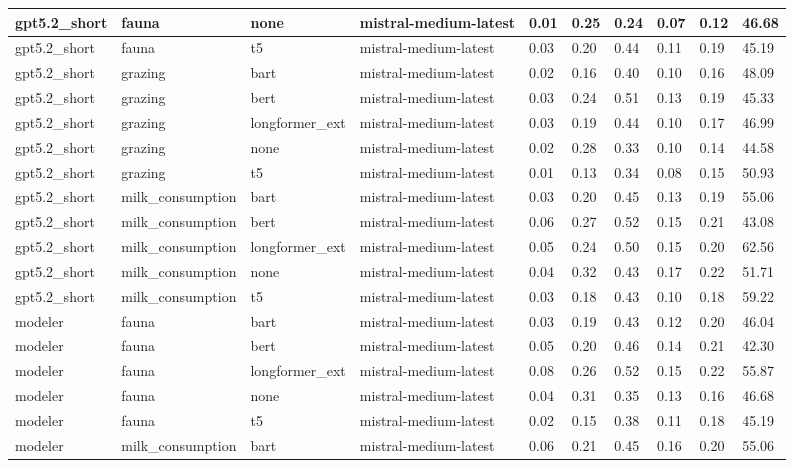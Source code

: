 \begin{tabular}{|l|l|l|l|l|l|l|l|l|l|}
 \hline
 gpt5.2\_short & fauna & none & mistral-medium-latest & 0.01 & 0.25 & 0.24 & 0.07 & 0.12 & 46.68 \\
 \hline
 gpt5.2\_short & fauna & t5 & mistral-medium-latest & 0.03 & 0.20 & 0.44 & 0.11 & 0.19 & 45.19 \\
 \hline
 gpt5.2\_short & grazing & bart & mistral-medium-latest & 0.02 & 0.16 & 0.40 & 0.10 & 0.16 & 48.09 \\
 \hline
 gpt5.2\_short & grazing & bert & mistral-medium-latest & 0.03 & 0.24 & 0.51 & 0.13 & 0.19 & 45.33 \\
 \hline
 gpt5.2\_short & grazing & longformer\_ext & mistral-medium-latest & 0.03 & 0.19 & 0.44 & 0.10 & 0.17 & 46.99 \\
 \hline
 gpt5.2\_short & grazing & none & mistral-medium-latest & 0.02 & 0.28 & 0.33 & 0.10 & 0.14 & 44.58 \\
 \hline
 gpt5.2\_short & grazing & t5 & mistral-medium-latest & 0.01 & 0.13 & 0.34 & 0.08 & 0.15 & 50.93 \\
 \hline
 gpt5.2\_short & milk\_consumption & bart & mistral-medium-latest & 0.03 & 0.20 & 0.45 & 0.13 & 0.19 & 55.06 \\
 \hline
 gpt5.2\_short & milk\_consumption & bert & mistral-medium-latest & 0.06 & 0.27 & 0.52 & 0.15 & 0.21 & 43.08 \\
 \hline
 gpt5.2\_short & milk\_consumption & longformer\_ext & mistral-medium-latest & 0.05 & 0.24 & 0.50 & 0.15 & 0.20 & 62.56 \\
 \hline
 gpt5.2\_short & milk\_consumption & none & mistral-medium-latest & 0.04 & 0.32 & 0.43 & 0.17 & 0.22 & 51.71 \\
 \hline
 gpt5.2\_short & milk\_consumption & t5 & mistral-medium-latest & 0.03 & 0.18 & 0.43 & 0.10 & 0.18 & 59.22 \\
 \hline
 modeler & fauna & bart & mistral-medium-latest & 0.03 & 0.19 & 0.43 & 0.12 & 0.20 & 46.04 \\
 \hline
 modeler & fauna & bert & mistral-medium-latest & 0.05 & 0.20 & 0.46 & 0.14 & 0.21 & 42.30 \\
 \hline
 modeler & fauna & longformer\_ext & mistral-medium-latest & 0.08 & 0.26 & 0.52 & 0.15 & 0.22 & 55.87 \\
 \hline
 modeler & fauna & none & mistral-medium-latest & 0.04 & 0.31 & 0.35 & 0.13 & 0.16 & 46.68 \\
 \hline
 modeler & fauna & t5 & mistral-medium-latest & 0.02 & 0.15 & 0.38 & 0.11 & 0.18 & 45.19 \\
 \hline
 modeler & milk\_consumption & bart & mistral-medium-latest & 0.06 & 0.21 & 0.45 & 0.16 & 0.20 & 55.06 \\

\end{tabular}
